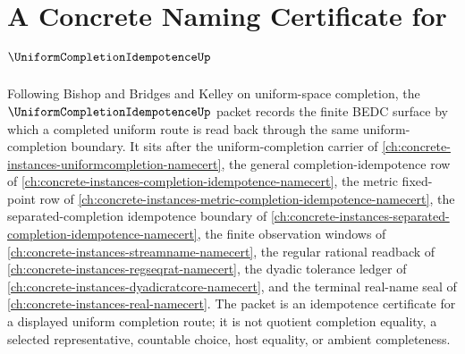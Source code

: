 \chapter{A Concrete Naming Certificate for $\UniformCompletionIdempotenceUp$}
\label{ch:concrete-instances-uniform-completion-idempotence-namecert}

Following Bishop and Bridges and Kelley on uniform-space completion, the $\UniformCompletionIdempotenceUp$ packet records the finite BEDC surface by which a completed uniform route is read back through the same uniform-completion boundary. It sits after the uniform-completion carrier of \autoref{ch:concrete-instances-uniformcompletion-namecert}, the general completion-idempotence row of \autoref{ch:concrete-instances-completion-idempotence-namecert}, the metric fixed-point row of \autoref{ch:concrete-instances-metric-completion-idempotence-namecert}, the separated-completion idempotence boundary of \autoref{ch:concrete-instances-separated-completion-idempotence-namecert}, the finite observation windows of \autoref{ch:concrete-instances-streamname-namecert}, the regular rational readback of \autoref{ch:concrete-instances-regseqrat-namecert}, the dyadic tolerance ledger of \autoref{ch:concrete-instances-dyadicratcore-namecert}, and the terminal real-name seal of \autoref{ch:concrete-instances-real-namecert}. The packet is an idempotence certificate for a displayed uniform completion route; it is not quotient completion equality, a selected representative, countable choice, host equality, or ambient completeness.

